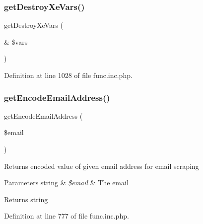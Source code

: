 \mbox{\label{func_8inc_8php_a563d33afe37e2b440a2f4500f58eeb64}} 
\subsubsection{\texorpdfstring{get\+Destroy\+Xe\+Vars()}{getDestroyXeVars()}}
{\footnotesize\ttfamily get\+Destroy\+Xe\+Vars (\begin{DoxyParamCaption}\item[{\&}]{\$vars }\end{DoxyParamCaption})}



Definition at line 1028 of file func.\+inc.\+php.

\mbox{\label{func_8inc_8php_a3ec2d6f22b5d041d959d1c56967b13ce}} 
\subsubsection{\texorpdfstring{get\+Encode\+Email\+Address()}{getEncodeEmailAddress()}}
{\footnotesize\ttfamily get\+Encode\+Email\+Address (\begin{DoxyParamCaption}\item[{}]{\$email }\end{DoxyParamCaption})}

Returns encoded value of given email address for email scraping


\begin{DoxyParams}[1]{Parameters}
string & {\em \$email} & The email \\
\hline
\end{DoxyParams}
\begin{DoxyReturn}{Returns}
string 
\end{DoxyReturn}


Definition at line 777 of file func.\+inc.\+php.

\mbox{\label{func_8inc_8php_a778b55fa9ebcf9a5ef0b017b998d9894}} 

